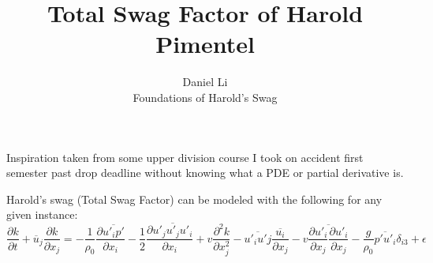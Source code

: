 \documentclass[12pt]{article}
\newenvironment{theorem}[2][Theorem]{\begin{trivlist}
\item[\hskip \labelsep {\bfseries #1}\hskip \labelsep {\bfseries #2.}]}{\end{trivlist}}
\begin{document}
 
 
\title{Total Swag Factor of Harold Pimentel}%
\author{Daniel Li\\ %
Foundations of Harold's Swag} %
 
\maketitle

\begin{introduction}
Inspiration taken from some upper division course I took on accident first semester past drop deadline without knowing what a PDE or partial derivative is.
\end{introduction}
\begin{theorem}{1} %
Harold's swag (Total Swag Factor) can be modeled with the following for any given instance:\\
$$\frac{\partial k}{\partial t} + \overline{u}_j \frac{\partial k}{\partial x_j} = - \frac{1}{\rho_0} \frac{\partial \overline{u'_ip'}}{\partial x_i} - \frac{1}{2} \frac{\partial \overline{u'_ju'_ju'_i}}{\partial x_i} + v \frac{\partial^2k}{\partial x^2_j} - \overline{u'_iu'j}\frac{\overline{u_i}}{\partial x_j} - v \overline{\frac{\partial u'_i}{\partial x_j}\frac{\partial u'_i}{\partial x_j}} - \frac{g}{\rho_0}\overline{p'u'_i}\delta_{i3} + \epsilon$$
\end{theorem}\\
\\
\end{document}
